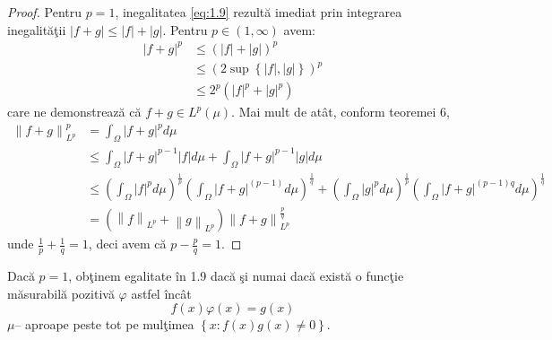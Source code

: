 \documentclass[a4paper,12pt,oneside]{report}
\begin{document}
\begin{proof}
Pentru \(p  = 1\), inegalitatea \ref{eq:1.9} rezult\u{a} imediat prin integrarea inegalit\u{a}\c{t}ii \(\left | f + g \right |\leq \left | f \right | + \left | g \right |\). Pentru \(p \in \left ( 1 , \infty  \right )\) avem:
\begin{equation} \nonumber
    \begin{split}
        \left | f + g  \right |^{p} &   \leq \left ( \left | f \right | +\left | g \right |\right )^{p} \\ & \leq \left ( 2 \sup\left \{ \left | f \right |,\left | g \right | \right \} \right )^{p} \\ & \leq 2^{p}\left ( \left | f \right |^{p}  + \left | g \right |^{p}\right )
    \end{split}
\end{equation}
care ne demonstreaz\u{a} c\u{a} \(f + g \in L^{p}\left ( \mu  \right )\). Mai mult de at\^{a}t, conform teoremei 6,
\begin{equation} \nonumber
    \begin{split}
         \left \| f + g  \right \|_{L^{p}}^{p}  &  = \int_{\Omega }\left | f + g \right |^{p}d\mu \\ & \leq \int_{\Omega }\left | f + g \right |^{p - 1}\left | f \right |d\mu + \int_{\Omega }\left | f + g  \right |^{p - 1}\left | g \right |d\mu \\ & \leq\left ( \int_{\Omega }\left | f \right |^{p}d\mu  \right )^{\frac{1}{p}}\left ( \int_{\Omega }\left | f + g  \right | ^{\left ( p - 1 \right )}d\mu \right )^{\frac{1}{q}}+ \left ( \int_{\Omega }\left | g \right |^{p}d\mu  \right )^{\frac{1}{p}}\left ( \int_{\Omega} \left | f + g \right |^{\left ( p - 1 \right )q}d\mu \right )^{\frac{1}{q}} \\ &  =\left ( \left \| f \right \|_{L^{p}} + \left \| g \right \|_{L^{p}} \right )\left \| f + g  \right \|_{L^{p}}^{\frac{p}{q}}
    \end{split}
\end{equation}
unde \(\frac{1}{p} + \frac{1}{q} = 1\), deci avem c\u{a} \(p - \frac{p}{q} = 1\).
\end{proof}

Dac\u{a} \(p = 1\), ob\c{t}inem egalitate \^{i}n 1.9 dac\u{a} \c{s}i numai dac\u{a} exist\u{a} o func\c{t}ie m\u{a}surabil\u{a} pozitiv\u{a} \(\varphi\) astfel \^{i}nc\^{a}t
\begin{displaymath}
  f\left ( x \right )\varphi \left ( x \right ) = g\left ( x \right )
\end{displaymath}
\(\mu –\) aproape peste tot pe mul\c{t}imea \(\left \{ x : f\left ( x \right )g\left ( x \right )\neq 0 \right \}\).
\end{document}
